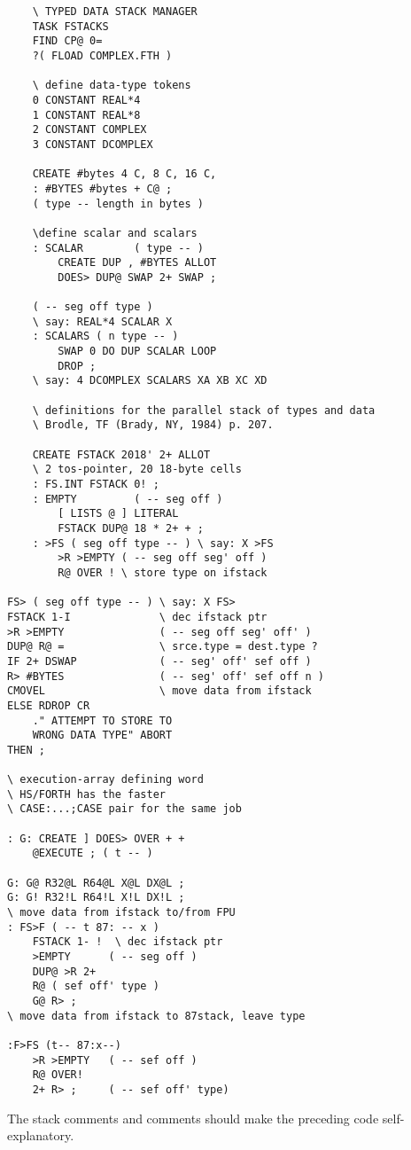 \begin{lstlisting}
    \ TYPED DATA STACK MANAGER
    TASK FSTACKS
    FIND CP@ 0=
    ?( FLOAD COMPLEX.FTH )

    \ define data-type tokens
    0 CONSTANT REAL*4
    1 CONSTANT REAL*8
    2 CONSTANT COMPLEX
    3 CONSTANT DCOMPLEX

    CREATE #bytes 4 C, 8 C, 16 C,
    : #BYTES #bytes + C@ ; 
    ( type -- length in bytes )

    \define scalar and scalars
    : SCALAR        ( type -- ) 
        CREATE DUP , #BYTES ALLOT 
        DOES> DUP@ SWAP 2+ SWAP ;

    ( -- seg off type )
    \ say: REAL*4 SCALAR X
    : SCALARS ( n type -- )
        SWAP 0 DO DUP SCALAR LOOP
        DROP ;
    \ say: 4 DCOMPLEX SCALARS XA XB XC XD

    \ definitions for the parallel stack of types and data 
    \ Brodle, TF (Brady, NY, 1984) p. 207.

    CREATE FSTACK 2018' 2+ ALLOT
    \ 2 tos-pointer, 20 18-byte cells
    : FS.INT FSTACK 0! ;
    : EMPTY         ( -- seg off )
        [ LISTS @ ] LITERAL
        FSTACK DUP@ 18 * 2+ + ;
    : >FS ( seg off type -- ) \ say: X >FS
        >R >EMPTY ( -- seg off seg' off )
        R@ OVER ! \ store type on ifstack

FS> ( seg off type -- ) \ say: X FS>
FSTACK 1-I              \ dec ifstack ptr
>R >EMPTY               ( -- seg off seg' off' )
DUP@ R@ =               \ srce.type = dest.type ? 
IF 2+ DSWAP             ( -- seg' off' sef off )
R> #BYTES               ( -- seg' off' sef off n )
CMOVEL                  \ move data from ifstack
ELSE RDROP CR 
    ." ATTEMPT TO STORE TO
    WRONG DATA TYPE" ABORT
THEN ;

\ execution-array defining word
\ HS/FORTH has the faster
\ CASE:...;CASE pair for the same job

: G: CREATE ] DOES> OVER + +
    @EXECUTE ; ( t -- )

G: G@ R32@L R64@L X@L DX@L ;
G: G! R32!L R64!L X!L DX!L ;
\ move data from ifstack to/from FPU
: FS>F ( -- t 87: -- x )
    FSTACK 1- !  \ dec ifstack ptr
    >EMPTY      ( -- seg off )
    DUP@ >R 2+
    R@ ( sef off' type )
    G@ R> ;
\ move data from ifstack to 87stack, leave type

:F>FS (t-- 87:x--)
    >R >EMPTY   ( -- sef off )
    R@ OVER!
    2+ R> ;     ( -- sef off' type)
\end{lstlisting}
 

The stack comments and comments should make the preceding code self-explanatory.

